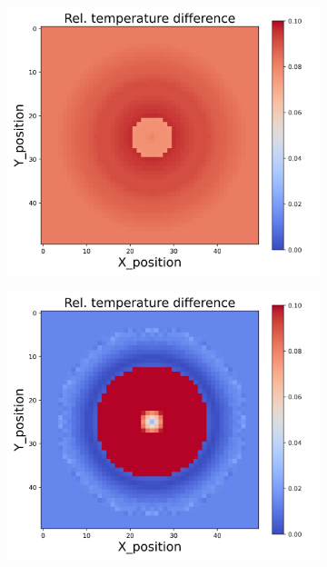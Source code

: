 {\begin{figure}[h]
\begin{minipage}{\textwidth}
\begin{subfigure}{0.28\textwidth}
            \includegraphics[width=\textwidth]{figures/raw_data/5/linear/T_bias.jpg}
        \end{subfigure}
        \begin{subfigure}{0.28\textwidth}
            \centering
            \includegraphics[width=\textwidth]{figures/raw_data/21/linear/T_bias.jpg}
        \end{subfigure}
    \end{minipage}\\

\end{figure}}
